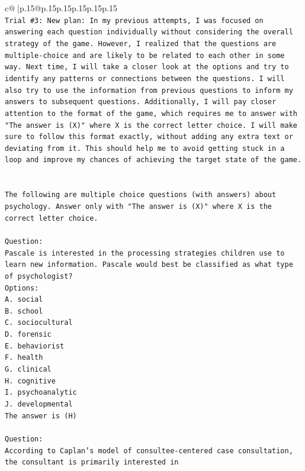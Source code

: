 \documentclass{article}
\begin{document}
{\begin{supertabular}{c@{$\;$}|p{.15\linewidth}@{}p{.15\linewidth}p{.15\linewidth}p{.15\linewidth}p{.15\linewidth}p{.15\linewidth}}
{{{\\ 
\texttt{Trial \#3: New plan: In my previous attempts, I was focused on answering each question individually without considering the overall strategy of the game. However, I realized that the questions are multiple{-}choice and are likely to be related to each other in some way. Next time, I will take a closer look at the options and try to identify any patterns or connections between the questions. I will also try to use the information from previous questions to inform my answers to subsequent questions. Additionally, I will pay closer attention to the format of the game, which requires me to answer with "The answer is (X)" where X is the correct letter choice. I will make sure to follow this format exactly, without adding any extra text or deviating from it. This should help me to avoid getting stuck in a loop and improve my chances of achieving the target state of the game.} \\
\\ 
\\ 
\texttt{The following are multiple choice questions (with answers) about psychology. Answer only with "The answer is (X)" where X is the correct letter choice.} \\
\\ 
\texttt{Question:} \\
\texttt{Pascale is interested in the processing strategies children use to learn new information. Pascale would best be classified as what type of psychologist?} \\
\texttt{Options:} \\
\texttt{A. social} \\
\texttt{B. school} \\
\texttt{C. sociocultural} \\
\texttt{D. forensic} \\
\texttt{E. behaviorist} \\
\texttt{F. health} \\
\texttt{G. clinical} \\
\texttt{H. cognitive} \\
\texttt{I. psychoanalytic} \\
\texttt{J. developmental} \\
\texttt{The answer is (H)} \\
\\ 
\texttt{Question:} \\
\texttt{According to Caplan's model of consultee{-}centered case consultation, the consultant is primarily interested in} \\
}}}
\end{supertabular}}
\end{document}
